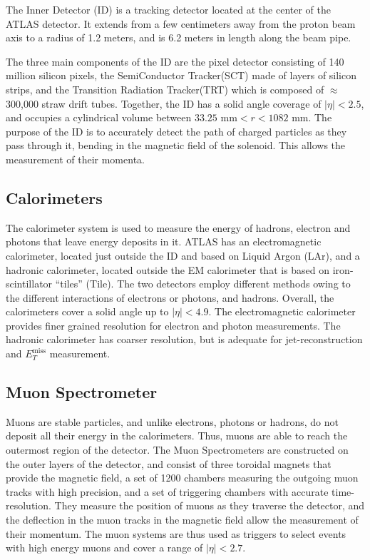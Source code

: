 \documentclass[11pt,a4paper,openright,twoside]{report}
\newcommand{\met}{$E_T^{\mathrm{miss}}$ }
\begin{document}
The Inner Detector (ID) \cite{inner_detector} is a tracking detector located at the center of the ATLAS detector. It extends from a few centimeters away from the proton beam axis to a radius of 1.2 meters, and is 6.2 meters in length along the beam pipe.

The three main components of the ID are the pixel detector consisting of 140 million silicon pixels, the SemiConductor Tracker(SCT) made of layers of silicon strips, and the Transition Radiation Tracker(TRT) which is composed of $\approx$300,000 straw drift tubes. Together, the ID has a solid angle coverage of $|\eta|<2.5$, and occupies a cylindrical volume between $33.25\text{ mm} < r<1082\text{ mm}$. The purpose of the ID is to accurately detect the path of charged particles as they pass through it, bending in the magnetic field of the solenoid. This allows the measurement of their momenta.

\subsection{Calorimeters}
The calorimeter system is used to measure the energy of hadrons, electron and photons that leave energy deposits in it. ATLAS has an electromagnetic calorimeter, located just outside the ID and based on Liquid Argon (LAr), and a hadronic calorimeter, located outside the EM calorimeter that is based on iron-scintillator ``tiles'' (Tile). The two detectors employ different methods owing to the different interactions of electrons or photons, and hadrons. Overall, the calorimeters cover a solid angle up to $|\eta|<4.9$. The electromagnetic calorimeter provides finer grained resolution for electron and photon measurements. The hadronic calorimeter has coarser resolution, but is adequate for jet-reconstruction and \met measurement.

\subsection{Muon Spectrometer}
Muons are stable particles, and unlike electrons, photons or hadrons, do not deposit all their energy in the calorimeters. Thus, muons are able to reach the outermost region of the detector. The Muon Spectrometers are constructed on the outer layers of the detector, and consist of three toroidal magnets that provide the magnetic field, a set of 1200 chambers measuring the outgoing muon tracks with high precision, and a set of triggering chambers with accurate time-resolution. They measure the position of muons as they traverse the detector, and the deflection in the muon tracks in the magnetic field allow the measurement of their momentum. The muon systems are thus used as triggers to select events with high energy muons and cover a range of $|\eta|<2.7$. 
\end{document}
